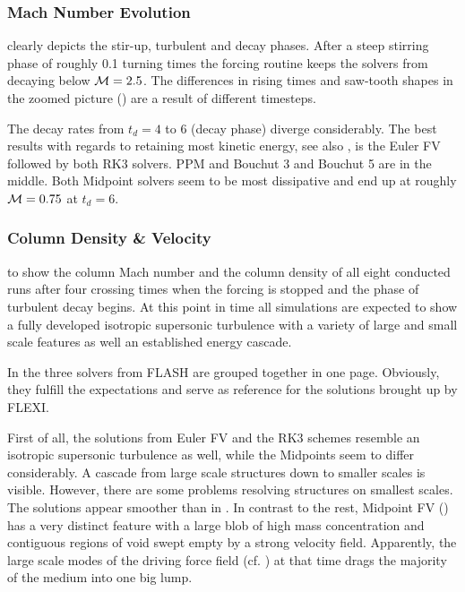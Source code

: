 \subsubsection{Mach Number Evolution}
 clearly depicts the stir-up,
turbulent and decay phases. After a steep stirring phase of roughly 0.1 turning
times the forcing routine keeps the solvers from decaying below $\mathcal{M} = 2.5$.
The differences in rising times and saw-tooth shapes in the zoomed picture
() are a result of
different timesteps.

The decay rates from $t_d = 4$ to 6 (decay phase) diverge considerably.
The best results with regards to retaining most kinetic energy, see also
, is the Euler FV followed by both RK3
solvers. PPM and Bouchut 3 and Bouchut 5 are in the middle. Both
Midpoint solvers seem to be most dissipative and end up at roughly $\mathcal{M} =
0.75$ at $t_d = 6$.

\subsubsection{Column Density \& Velocity}
\label{sec:stirturb-column-plots}
 to
 show the column Mach number
and the column density of all eight conducted runs after four crossing times
when the forcing is stopped and the phase of turbulent decay begins. At this
point in time all simulations are expected to show a fully developed
isotropic supersonic turbulence with a variety of large and small scale
features as well an established energy cascade.

In  the three solvers from
FLASH are grouped together in one page. Obviously, they fulfill the
expectations and serve as reference for the solutions brought up by FLEXI.

First of all, the solutions from Euler FV and the RK3 schemes resemble an
isotropic supersonic turbulence as well, while the Midpoints seem to differ
considerably. A cascade from large scale structures down to smaller
scales is visible. However, there are some problems resolving
structures on smallest scales. The solutions appear smoother than in
. In contrast to the rest,
Midpoint FV () has a very
distinct feature with a large blob of high mass concentration and
contiguous regions of void swept empty by a strong velocity field.
Apparently, the large scale modes of the driving force field (cf.
) at that time drags the majority of the medium into one big
lump. 

